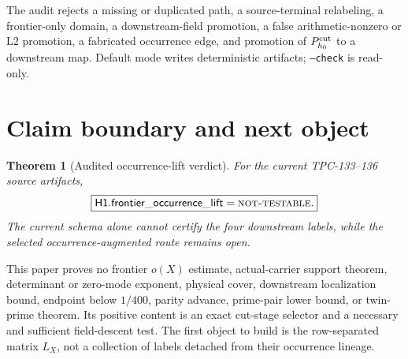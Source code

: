 \documentclass[11pt]{article}
\newtheorem{theorem}{Theorem}[section]
\theoremstyle{definition}
\theoremstyle{remark}
\newcommand{\NT}{\textnormal{\textsc{not-testable}}}
\newcommand{\Ltwo}{\mathrm{L2}}
\begin{document}
The audit rejects a missing or duplicated path, a source-terminal
relabeling, a frontier-only domain, a downstream-field promotion, a
false arithmetic-nonzero or \(\Ltwo\) promotion, a fabricated
occurrence edge, and promotion of \(P_{h_0}^{\rm cut}\) to a
downstream map.
Default mode writes deterministic artifacts; \texttt{--check} is
read-only.

\section{Claim boundary and next object}

\begin{theorem}[Audited occurrence-lift verdict]
\label{thm:verdict}
For the current TPC-133--136 source artifacts,
\[
 \boxed{
 \mathsf{H1.frontier\_occurrence\_lift}=\NT.}
\]
The current schema alone cannot certify the four downstream labels,
while the selected occurrence-augmented route remains open.
\end{theorem}

This paper proves no frontier \(o(X)\) estimate, actual-carrier
support theorem, determinant or zero-mode exponent, physical cover,
downstream localization bound, endpoint below \(1/400\), parity
advance, prime-pair lower bound, or twin-prime theorem.  Its positive
content is an exact cut-stage selector and a necessary and sufficient
field-descent test.  The first object to build is the row-separated
matrix \(L_X\), not a collection of labels detached from their
occurrence lineage.

\begingroup
\small
\raggedright


\endgroup
\end{document}

